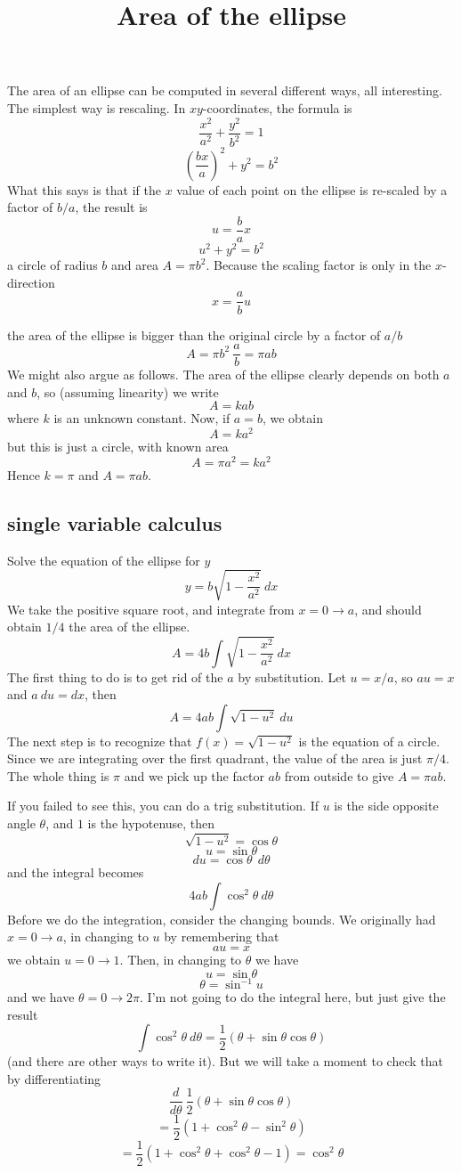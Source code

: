 \documentclass[11pt, oneside]{article}
\title{Area of the ellipse}
\date{}
\begin{document}
\maketitle
\Large

The area of an ellipse can be computed in several different ways, all interesting.  The simplest way is rescaling.  In $xy$-coordinates, the formula is
\[ \frac{x^2}{a^2} + \frac{y^2}{b^2} = 1 \]
\[ (\frac{bx}{a})^2 + y^2 = b^2 \]
What this says is that if the $x$ value of each point on the ellipse is re-scaled by a factor of $b/a$, the result is
\[ u = \frac{b}{a}x \]
\[ u^2 + y^2 = b^2 \]
a circle of radius $b$ and area $A = \pi b^2$.  Because the scaling factor is only in the $x$-direction
\[ x = \frac{a}{b}u \]

the area of the ellipse is bigger than the original circle by a factor of $a/b$
\[ A = \pi b^2 \ \frac{a}{b} = \pi ab \]
We might also argue as follows.  The area of the ellipse clearly depends on both $a$ and $b$, so (assuming linearity) we write
\[ A = k a b \]
where $k$ is an unknown constant.  Now, if $a=b$, we obtain
\[ A = k a^2 \]
but this is just a circle, with known area
\[ A = \pi a^2 = k a^2 \]
Hence $k = \pi$ and $A = \pi ab$.

\subsection*{single variable calculus}
Solve the equation of the ellipse for $y$
\[ y = b \sqrt{1 - \frac{x^2}{a^2} } \ dx  \]
We take the positive square root, and integrate from $x = 0 \rightarrow a$, and should obtain $1/4$ the area of the ellipse.
\[ A = 4 b \int \sqrt{1 - \frac{x^2}{a^2} }  \ dx \]
The first thing to do is to get rid of the $a$ by substitution.  Let $u = x/a$, so $au = x$ and $a \ du = dx$, then
\[ A = 4 ab \int \sqrt{1 - u^2} \ du  \]
The next step is to recognize that $f(x) = \sqrt{1-u^2}$ is the equation of a circle.  Since we are integrating over the first quadrant, the value of the area is just $\pi/4$.  The whole thing is $\pi$ and we pick up the factor $ab$ from outside to give $A = \pi ab$.

If you failed to see this, you can do a trig substitution.  If $u$ is the side opposite angle $\theta$, and $1$ is the hypotenuse, then 
\[ \sqrt{1-u^2} = \cos \theta \]
\[ u = \sin \theta \]
\[ du = \cos \theta \ \ d\theta \]
and the integral becomes
\[ 4 ab \int \cos^2 \theta \ d\theta  \]
Before we do the integration, consider the changing bounds.  We originally had $x = 0 \rightarrow a$, in changing to $u$ by remembering that
\[ au = x \]
we obtain $u = 0 \rightarrow 1$.  Then, in changing to $\theta$ we have
\[ u = \sin \theta \]
\[ \theta = \sin^{-1} u \]
and we have $\theta = 0 \rightarrow 2\pi$.
I'm not going to do the integral here, but just give the result
\[ \int \cos^2 \theta \ d \theta = \frac{1}{2} (\theta + \sin \theta \cos \theta) \]
(and there are other ways to write it).  But we will take a moment to check that by differentiating
\[ \frac{d}{d \theta} \ \frac{1}{2} (\theta + \sin \theta \cos \theta) \]
\[ =  \frac{1}{2}(1 + \cos^2 \theta - \sin^2 \theta) \]
\[ =  \frac{1}{2}(1 + \cos^2 \theta + \cos^2 \theta - 1) = \cos^2 \theta \]
\end{document}
